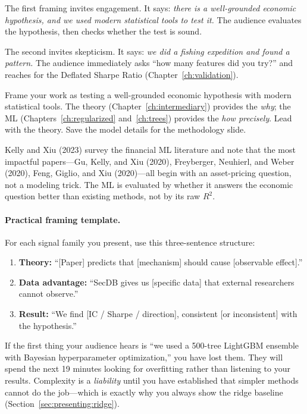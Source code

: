 The first framing invites engagement.  It says: \emph{there is a
well-grounded economic hypothesis, and we used modern statistical tools to
test it.}  The audience evaluates the hypothesis, then checks whether the
test is sound.

The second invites skepticism.  It says: \emph{we did a fishing expedition
and found a pattern.}  The audience immediately asks ``how many features did
you try?'' and reaches for the Deflated Sharpe Ratio
(Chapter~\ref{ch:validation}).

\begin{keyidea}
Frame your work as testing a well-grounded economic hypothesis with modern
statistical tools.  The theory
(Chapter~\ref{ch:intermediary}) provides the \emph{why}; the ML
(Chapters~\ref{ch:regularized} and~\ref{ch:trees}) provides the
\emph{how precisely}.  Lead with the theory.  Save the model details for
the methodology slide.
\end{keyidea}

Kelly and Xiu (2023) survey the financial ML literature and note that the
most impactful papers---Gu, Kelly, and Xiu (2020), Freyberger, Neuhierl, and
Weber (2020), Feng, Giglio, and Xiu (2020)---all begin with an asset-pricing
question, not a modeling trick.  The ML is evaluated by whether it answers
the economic question better than existing methods, not by its raw $R^2$.

\paragraph{Practical framing template.}
For each signal family you present, use this three-sentence structure:

\begin{enumerate}[leftmargin=1.5em]
  \item \textbf{Theory:} ``[Paper] predicts that [mechanism] should cause
    [observable effect].''
  \item \textbf{Data advantage:} ``SecDB gives us [specific data] that
    external researchers cannot observe.''
  \item \textbf{Result:} ``We find [IC / Sharpe / direction], consistent
    [or inconsistent] with the hypothesis.''
\end{enumerate}

\begin{warning}
If the first thing your audience hears is ``we used a 500-tree LightGBM
ensemble with Bayesian hyperparameter optimization,'' you have lost them.
They will spend the next 19 minutes looking for overfitting rather than
listening to your results.  Complexity is a \emph{liability} until you have
established that simpler methods cannot do the job---which is exactly why you
always show the ridge baseline (Section~\ref{sec:presenting:ridge}).
\end{warning}

